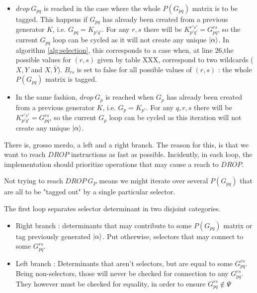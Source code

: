 \documentclass[./thesis.tex]{subfiles}
\begin{document}
\begin{itemize}
\item
$drop\ G_{pq}$ is reached in the case where the whole $P(G_{pq})$ matrix is to be tagged. This happens if $G_{pq}$ has already been created from a previous generator $K$, i.e. $G_{pq} = K_{p'q'}$. For any $r,s$ there will be $K_{p'q'}^{r's'} = G_{pq}^{rs}$, so the current $G_{pq}$ loop can be cycled as it will not create any unique $\ket \alpha$.
In algorithm \ref{alg:selection}, this corresponds to a case when, at line 26,the possible values for $(r,s)$ given by table XXX, correspond to two wildcards ($X,Y$ and $X,\bar Y$). $B_{rs}$ is set to false for all possible values of $(r,s)$ : the whole $P(G_{pq})$ matrix is tagged.
\item
In the same fashion, $drop\ G_{p}$ is reached when $G_{p}$ has already been created from a previous generator $K$, i.e. $G_{p} = K_{p'}$. For any $q,r,s$ there will be $K_{p'q'}^{r's'} = G_{pq}^{rs}$, so the current $G_{p}$ loop can be cycled as this iteration will not create any unique $\ket \alpha$.\\
\end{itemize}


There is, grosso merdo, a left and a right branch. The reason for this, is that we want to reach $DROP$ instructions as fast as possible. Incidently, in each loop, the implementation should prioritize operations that may cause a reach to $DROP$.

Not trying to reach $DROP\ G_{P}$ means we might iterate over several $P(G_{pq})$ that are all to be "tagged out" by a single particular selector.

The first loop separates selector determinant in two disjoint categories.

\begin{itemize}
\item
Right branch : determinants that may contribute to some $P(G_{pq})$ matrix or tag previously generated $\ket \alpha$. Put otherwise, selectors that may connect to some $G_{pq}^{rs}$.

\item
Left branch : Determinants that aren't selectors, but are equal to some $G_{pq}^{rs}$. Being non-selectors, those will never be checked for connection to any $G_{pq}^{rs}$. They however must be checked for equality, in order to ensure $G_{pq}^{rs} \notin \Psi$
\end{itemize}
\end{document}
